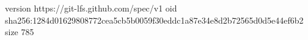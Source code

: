 version https://git-lfs.github.com/spec/v1
oid sha256:1284d01629808772cea5cb5b0059f30eddc1a87e34e8d2b72565d0d5e44ef6b2
size 785

